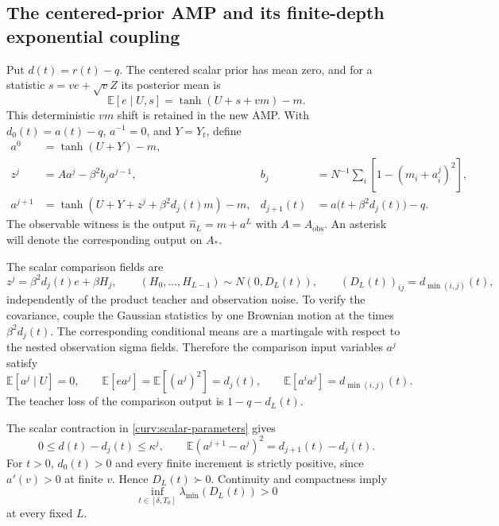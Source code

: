 \documentclass[11pt,reqno]{amsart}
\begin{document}
\subsection{The centered-prior AMP and its finite-depth exponential coupling}
\label{curv:new-amp}

Put $d(t)=r(t)-q$. The centered scalar prior has mean zero, and for a
statistic $s=ve+\sqrt v Z$ its posterior mean is
\begin{equation*}
            \mathbb E[e\mid U,s]
              =\tanh(U+s+v m)-m.
\end{equation*}
This deterministic $vm$ shift is retained in the new AMP. With
$d_0(t)=a(t)-q$, $a^{-1}=0$, and $Y=Y_t$, define
\begin{align*}
 a^0&=\tanh(U+Y)-m,\\
 z^j&=Aa^j-\beta^2b_j a^{j-1},
      &b_j&=N^{-1}\sum_i[1-(m_i+a_i^j)^2],\\
 a^{j+1}&=\tanh(U+Y+z^j+\beta^2d_j(t)m)-m,
      &d_{j+1}(t)&=a\bigl(t+\beta^2d_j(t)\bigr)-q.
\end{align*}
The observable witness is the output $\widehat n_L=m+a^L$ with
$A=A_{\mathrm{obs}}$. An asterisk will denote the corresponding output
on $A_*$.

The scalar comparison fields are
\begin{equation*}
 z^j=\beta^2d_j(t)e+\beta H_j,
 \qquad (H_0,\ldots,H_{L-1})\sim N(0,D_L(t)),
 \qquad (D_L(t))_{ij}=d_{\min(i,j)}(t),
\end{equation*}
independently of the product teacher and observation noise. To verify the
covariance, couple the Gaussian statistics by one Brownian motion at the
times $\beta^2d_j(t)$. The corresponding conditional means are a
martingale with respect to the nested observation sigma fields. Therefore
the comparison input variables $a^j$ satisfy
\begin{equation}\label{curv:new-gram}
 \mathbb E[a^j\mid U]=0,\qquad
 \mathbb E[e a^j]=\mathbb E[(a^j)^2]=d_j(t),\qquad
 \mathbb E[a^ia^j]=d_{\min(i,j)}(t).
\end{equation}
The teacher loss of the comparison output is $1-q-d_L(t)$.

The scalar contraction in \eqref{curv:scalar-parameters} gives
\begin{equation}\label{curv:depth-error}
 0\le d(t)-d_j(t)\le\kappa^j,
 \qquad
 \mathbb E(a^{j+1}-a^j)^2=d_{j+1}(t)-d_j(t).
\end{equation}
For $t>0$, $d_0(t)>0$ and every finite increment is strictly positive,
since $a'(v)>0$ at finite $v$. Hence $D_L(t)\succ0$. Continuity and
compactness imply
\begin{equation}\label{curv:new-gram-uniform}
     \inf_{t\in[\delta,T_0]}\lambda_{\min}(D_L(t))>0
\end{equation}
at every fixed $L$.
\end{document}
